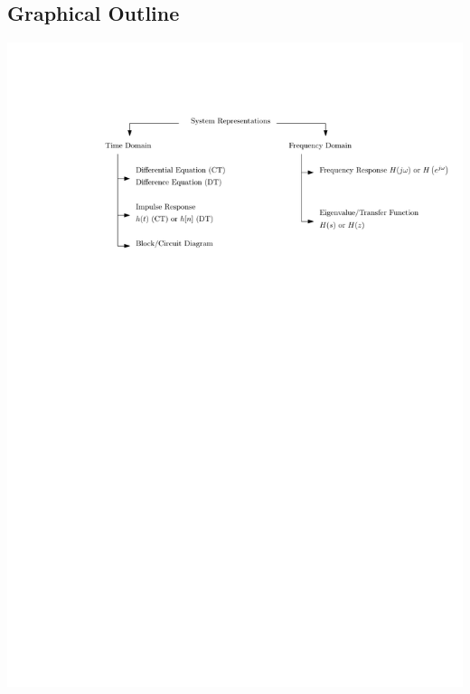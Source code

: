 \subsection*{Graphical Outline}

\begin{center}
  \includegraphics[scale=1]{graphics/system-representations-fig.pdf}
\end{center}
